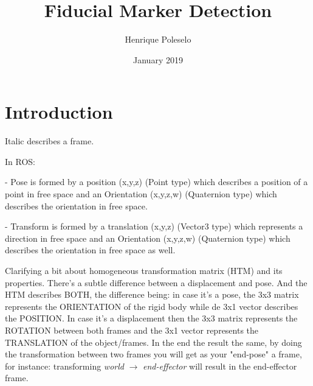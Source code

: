 \documentclass{article}
\title{Fiducial Marker Detection}
\author{Henrique Poleselo }
\date{January 2019}
\begin{document}
\maketitle

\section{Introduction}
Italic describes a frame.

In ROS:

- Pose is formed by a position (x,y,z) (Point type) which describes a position of a point in free space and an Orientation (x,y,z,w) (Quaternion type) which describes the orientation in free space.

- Transform is formed by a translation (x,y,z) (Vector3 type) which represents a direction in free space and an Orientation (x,y,z,w) (Quaternion type) which describes the orientation in free space as well.

Clarifying a bit about homogeneous transformation matrix (HTM) and its properties. There's a subtle difference between a displacement and pose. And the HTM describes BOTH, the difference being: in case it's a pose, the 3x3 matrix represents the ORIENTATION of the rigid body while de 3x1 vector describes the POSITION. In case it's a displacement then the 3x3 matrix represents the ROTATION between both frames and the 3x1 vector represents the TRANSLATION of the object/frames. In the end the result the same, by doing the transformation between two frames you will get as your "end-pose" a frame, for instance: transforming \textit{world} $\xrightarrow{}$ \textit{end-effector} will result in the end-effector frame.
\end{document}

